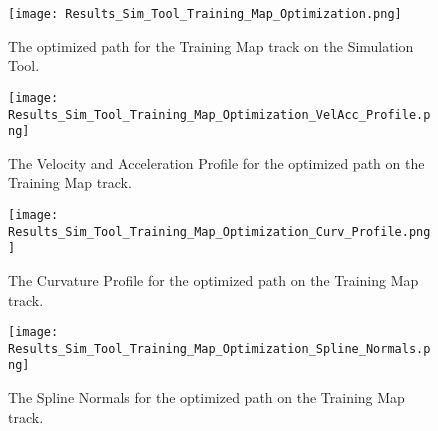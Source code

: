 \begin{figure}[H]
    \centering
    \texttt{[image: Results\_Sim\_Tool\_Training\_Map\_Optimization.png]}
    \caption{The optimized path for the Training Map track on the Simulation Tool.}
    \label{fig:Results Sim Tool Training Map Optimization}
\end{figure}
\begin{figure}[H]
    \centering
    \texttt{[image: Results\_Sim\_Tool\_Training\_Map\_Optimization\_VelAcc\_Profile.png]}
    \caption{The Velocity and Acceleration Profile for the optimized path on the Training Map track.}
    \label{fig:Results Sim Tool Training Map Optimization VelAcc Profile}
\end{figure}
\begin{figure}[H]
    \centering
    \texttt{[image: Results\_Sim\_Tool\_Training\_Map\_Optimization\_Curv\_Profile.png]}
    \caption{The Curvature Profile for the optimized path on the Training Map track.}
    \label{fig:Results Sim Tool Training Map Optimization Curv Profile}
\end{figure}
\begin{figure}[H]
    \centering
    \texttt{[image: Results\_Sim\_Tool\_Training\_Map\_Optimization\_Spline\_Normals.png]}
    \caption{The Spline Normals for the optimized path on the Training Map track.}
    \label{fig:Results Sim Tool Training Map Optimization Spline Normals}
\end{figure}
